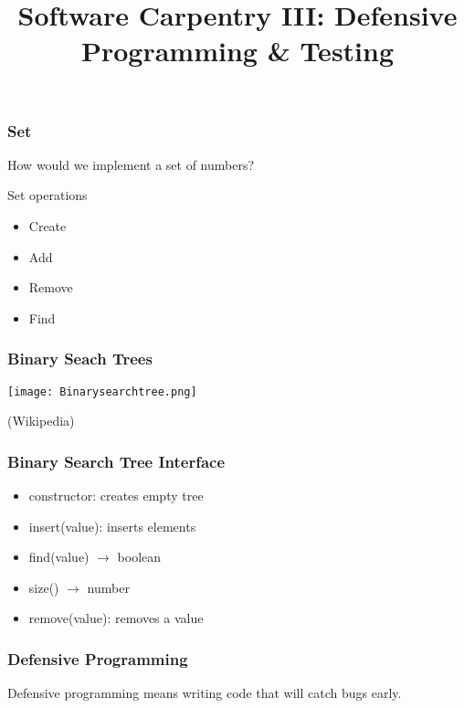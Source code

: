 
\title[SC3: Defensive Programming \& Testing]{Software Carpentry III: Defensive Programming \& Testing}

\frame{\maketitle}

\begin{frame}[fragile]
\frametitle{Set}
How would we implement a set of numbers?

\begin{block}{Set operations}
\begin{itemize}
\item Create
\item Add
\item Remove
\item Find
\end{itemize}
\end{block}
\end{frame}

\begin{frame}[fragile]
\frametitle{Binary Seach Trees}

\centering
\texttt{[image: Binarysearchtree.png]}

\begin{flushright}
(Wikipedia)
\end{flushright}

\end{frame}

\begin{frame}[fragile]
\frametitle{Binary Search Tree Interface}

\begin{itemize}
\item constructor: creates empty tree
\item insert(value): inserts elements
\item find(value) $\to$ boolean
\item size() $\to$ number
\item remove(value): removes a value
\end{itemize}
\end{frame}

\begin{frame}[fragile]
\frametitle{Defensive Programming}

Defensive programming means writing code that will catch bugs early.
\end{frame}

